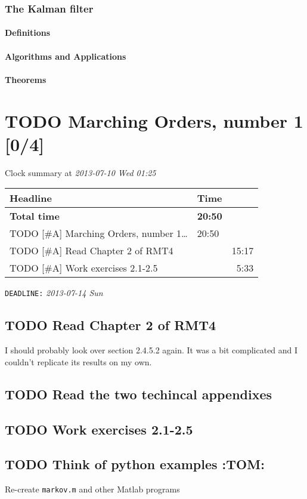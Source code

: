 \documentclass[11pt]{article}
\begin{document}
\subsubsection{The Kalman filter}
\label{sec-1-1-6}
\paragraph{Definitions}
\label{sec-1-1-6-1}
\paragraph{Algorithms and Applications}
\label{sec-1-1-6-2}
\paragraph{Theorems}
\label{sec-1-1-6-3}
\section{\textbf{TODO} Marching Orders, number 1 [0/4]}
\label{sec-2}


Clock summary at \textit{2013-07-10 Wed 01:25}


\begin{center}
\begin{tabular}{llr}
 Headline                                        &  Time            &         \\
\hline
 \textbf{Total time}                             &  \textbf{20:50}  &         \\
\hline
 TODO [\#A] Marching Orders, number 1\ldots{}    &  20:50           &         \\
 \hspace{3ex} TODO [\#A] Read Chapter 2 of RMT4  &                  &  15:17  \\
 \hspace{3ex} TODO [\#A] Work exercises 2.1-2.5  &                  &   5:33  \\
\end{tabular}
\end{center}



  \texttt{DEADLINE:} \textit{2013-07-14 Sun}
\subsection{\textbf{TODO} Read Chapter 2 of RMT4}
\label{sec-2-1}


I should probably look over section 2.4.5.2 again. It was a bit
complicated and I couldn't replicate its results on my own.
\subsection{\textbf{TODO} Read the two techincal appendixes}
\label{sec-2-2}
\subsection{\textbf{TODO} Work exercises 2.1-2.5}
\label{sec-2-3}
\subsection{\textbf{TODO} Think of python examples \textbf{:TOM:}}
\label{sec-2-4}


Re-create \texttt{markov.m} and other Matlab programs
\end{document}

